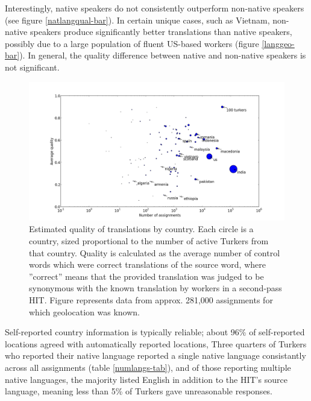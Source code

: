 \documentclass[11pt]{article}
\begin{document}
Interestingly, native speakers do not consistently outperform non-native speakers (see figure \ref{natlangqual-bar}). In certain unique cases, such as Vietnam, non-native speakers produce significantly better translations than native speakers, possibly due to a large population of fluent US-based workers (figure \ref{langgeo-bar}). In general, the quality difference between native and non-native speakers is not significant.	


\begin{figure}[h]
\centering
\includegraphics[width=6in]{figures/quality-scatter}
\caption{Estimated quality of translations by country. Each circle is a country, sized proportional to the number of active Turkers from that country. Quality is calculated as the average number of control words which were correct translations of the source word, where ”correct” means that the provided translation was judged to be synonymous with the known translation by workers in a second-pass HIT. Figure represents data from approx. 281,000 assignments for which geolocation was known.}
\label{quality-scatter}
\end{figure}

Self-reported country information is typically reliable; about 96\% of self-reported locations agreed with automatically reported locations, 
Three quarters of Turkers who reported their native language reported a single native language consistantly across all assignments (table \ref{numlangs-tab}), and of those reporting multiple native languages, the majority listed English in addition to the HIT's source language, meaning less than 5\% of Turkers gave unreasonable responses.  
\end{document}
